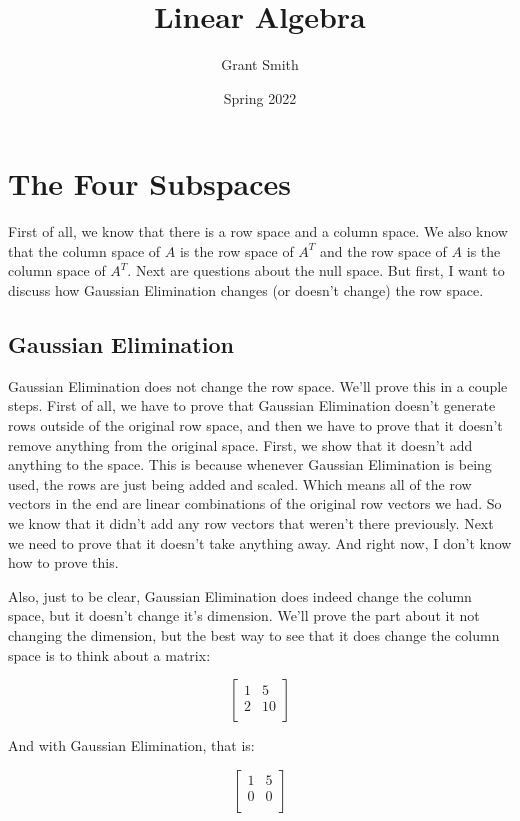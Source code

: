 \documentclass{article}
\title{Linear Algebra}
\author{Grant Smith}
\date{Spring 2022}
\begin{document}
\maketitle

\section{The Four Subspaces}

First of all, we know that there is a row space and a column space. We also know that the column space of $A$ is the row space of $A^T$ and the row space of $A$ is the column space of $A^T$. Next are questions about the null space.  But first, I want to discuss how Gaussian Elimination changes (or doesn't change) the row space.
\subsection{Gaussian Elimination} 
Gaussian Elimination does not change the row space. We'll prove this in a couple steps. First of all, we have to prove that Gaussian Elimination doesn't generate rows outside of the original row space, and then we have to prove that it doesn't remove anything from the original space. First, we show that it doesn't add anything to the space. This is because whenever Gaussian Elimination is being used, the rows are just being added and scaled. Which means all of the row vectors in the end are linear combinations of the original row vectors we had. So we know that it didn't add any row vectors that weren't there previously. Next we need to prove that it doesn't take anything away. And right now, I don't know how to prove this.

Also, just to be clear, Gaussian Elimination does indeed change the column space, but it doesn't change it's dimension. We'll prove the part about it not changing the dimension, but the best way to see that it does change the column space is to think about a matrix: 

$$\begin{bmatrix}
  1  & 5 \\
  2  & 10 \\
   \end{bmatrix}$$

And with Gaussian Elimination, that is:

$$\begin{bmatrix}
    1  & 5 \\
    0  & 0 \\
\end{bmatrix}$$
\end{document}
